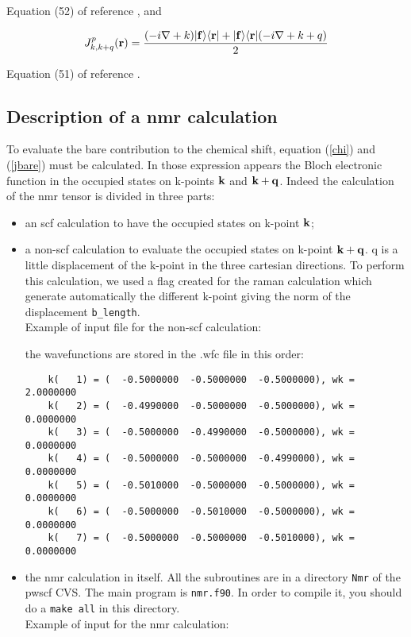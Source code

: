 \documentclass[11pt, a4paper]{article}
\begin{document}
Equation (52) of reference \cite{PRB_GIPAW}, and

\begin{equation}
J^p_{k,k+q}({\bf r})=\frac{(-i\nabla+k)|{\bf f}\rangle\langle{\bf r}|
+ |{\bf f}\rangle\langle{\bf r}|(-i\nabla+k+q)}{2}
\end{equation}

Equation (51) of reference \cite{PRB_GIPAW}.

\subsection{Description of a nmr calculation}

To evaluate the bare contribution to the chemical shift, equation
(\ref{chi}) and (\ref{jbare}) must be calculated. In those expression
appears the Bloch electronic function in the occupied states on
k-points ${\bf k}$ and ${\bf k+q}$. Indeed the calculation of the nmr
tensor is divided in three parts:
\begin{itemize}
\item an scf calculation to have the occupied states on k-point ${\bf
  k}$;
\item a non-scf calculation to evaluate the occupied states on k-point
  ${\bf k+q}$. q is a little displacement of the k-point in the three
  cartesian directions. To perform this calculation, we used a flag
  created for the raman calculation which generate automatically the
  different k-point giving the norm of the displacement
  \verb+b_length+.\\

  Example of input file for the non-scf calculation:

  

  the wavefunctions are stored in the .wfc file in this order:

\begin{verbatim}
    k(   1) = (  -0.5000000  -0.5000000  -0.5000000), wk =   2.0000000
    k(   2) = (  -0.4990000  -0.5000000  -0.5000000), wk =   0.0000000
    k(   3) = (  -0.5000000  -0.4990000  -0.5000000), wk =   0.0000000
    k(   4) = (  -0.5000000  -0.5000000  -0.4990000), wk =   0.0000000
    k(   5) = (  -0.5010000  -0.5000000  -0.5000000), wk =   0.0000000
    k(   6) = (  -0.5000000  -0.5010000  -0.5000000), wk =   0.0000000
    k(   7) = (  -0.5000000  -0.5000000  -0.5010000), wk =   0.0000000
\end{verbatim}


\item the nmr calculation in itself. All the subroutines are in a
  directory \verb+Nmr+ of the pwscf CVS. The main program is
  \verb+nmr.f90+. In order to compile it, you should do a
  \verb+make all+ in  this directory. \\

  Example of input for the nmr calculation:

  
  
\end{itemize}
\end{document}
